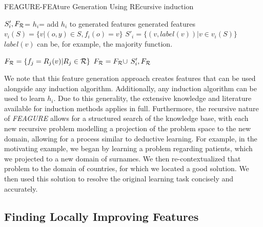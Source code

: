 \documentclass[twoside,11pt]{article}
\theoremstyle{definition}
\begin{document}
\begin{algorithm}[H]
	\caption{FEAGURE-FEAture Generation Using REcursive induction}
	\label{code-creating-prob}
	\small
		\begin{algorithmic}
				\State $S'_i,F_{\cal R}$=  
				\State $h_i$=  
				\State add $h_i$ to generated features
				\EndFor
				\State \Return generated features
			\EndFunction
			\State 
                \State $v_i(S) = \{v | (o,y) \in S, f_{i}(o)=v\}$
                \State $S'_i = \{ (v, label(v)) | v \in v_i(S) \}$ 
                \Comment $label(v)$ can be, for example, the majority function.

                \State $F_{\cal R}=\{f_{j}=R_j(v)| R_j\in{\cal R}\}$
	                \State $F_{\cal R}=F_{\cal R}\cup$
	            \EndIf
                \State \Return $S'_i, F_{\cal R}$ 
			\EndFunction
			
		\end{algorithmic}
	\end{algorithm}

We note that this feature generation approach creates features that can be used alongside any induction algorithm. Additionally, any induction algorithm can be used to learn $h_i$. Due to this generality, the extensive knowledge and literature available for induction methods applies in full. Furthermore, the recursive nature of \emph{FEAGURE} allows for a structured search of the knowledge base, with each new recursive problem modelling a projection of the problem space to the new domain, allowing for a process similar to deductive learning. For example, in the motivating example, we began by learning a problem regarding patients, which we projected to a new domain of surnames. We then re-contextualized that problem to the domain of countries, for which we located a good solution. We then used this solution to resolve the original learning task concisely and accurately.


\subsection{Finding Locally Improving Features} \label{tree_usage}
\end{document}
